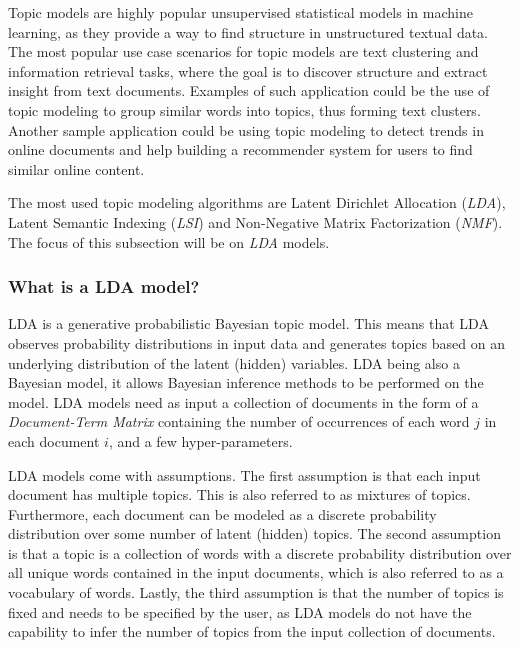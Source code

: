         Topic models are highly popular unsupervised statistical models in machine learning, as they provide a way to find structure in unstructured textual data. The most popular use case scenarios for topic models are text clustering and information retrieval tasks, where the goal is to discover structure and extract insight from text documents. Examples of such application could be the use of topic modeling to group similar words into topics, thus forming text clusters. Another sample application could be using topic modeling to detect trends in online documents and help building a recommender system for users to find similar online content. 
        
        The most used topic modeling algorithms are Latent Dirichlet Allocation (\emph{LDA}), Latent Semantic Indexing (\emph{LSI}) and Non-Negative Matrix Factorization (\emph{NMF}). The focus of this subsection will be on \emph{LDA} models.
    
        \subsubsection{What is a LDA model?}
        
            
           LDA is a generative probabilistic Bayesian topic model. This means that LDA observes probability distributions in input data and generates topics based on an underlying distribution of the latent (hidden) variables. LDA being also a Bayesian model, it allows Bayesian inference methods to be performed on the model. LDA models need as input a collection of documents in the form of a \emph{Document-Term Matrix} containing the number of occurrences of each word $j$ in each document $i$, and a few hyper-parameters. 
           
           LDA models come with assumptions. The first assumption is that each input document has multiple topics. This is also referred to as mixtures of topics. Furthermore, each document can be modeled as a discrete probability distribution over some number of latent (hidden) topics. The second assumption is that a topic is a collection of words with a discrete probability distribution over all unique words contained in the input documents, which is also referred to as a vocabulary of words. Lastly, the third assumption is that the number of topics is fixed and needs to be specified by the user, as LDA models do not have the capability to infer the number of topics from the input collection of documents.
           
